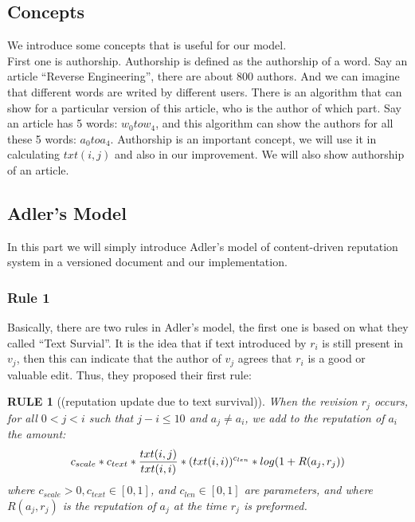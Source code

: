 \documentclass[preprint,review,12pt]{elsarticle}
\begin{document}
\subsection{Concepts}
We introduce some concepts that is useful for our model.\\
First one is authorship. Authorship is defined as the authorship of a word. Say
an article ``Reverse Engineering'', there are about 800 authors. And we can
imagine that different words are writed by different users. There is an
algorithm that can show for a particular version of this article, who is the
author of which part. Say an article has 5 words: $w_0 to w_4$, and this
algorithm can show the authors for all these 5 words: $a_0 to a_4$. Authorship
is an important concept, we will use it in calculating $txt(i,j)$ and also in
our improvement. We will also show authorship of an article.\\

\subsection{Adler's Model}
In this part we will simply introduce Adler's model of content-driven reputation
system in a versioned document and our implementation.\\
\subsubsection{Rule 1}
Basically, there are two rules in Adler's model, the first one is based on what
they called ``Text Survial''. It is the idea that if text introduced by $r_i$ is
still present in $v_j$, then this can indicate that the author of $v_j$ agrees
that $r_i$ is a good or valuable edit. Thus, they proposed their first rule:\\
\newtheorem{ruullee}{RULE}
\begin{ruullee}[(reputation update due to text survival)]
  When the revision $r_j$ occurs, for all $0<j<i$ such that $j-i \leq 10$ and
  $a_j \neq a_i$, we add to the reputation of $a_i$ the amount:\\
  \[
  \centering c_{scale}*c_{text}*\frac{txt(i,j)}{txt(i,i)}*(txt(i,i))^{c_{len}}*log(1+R(a_j,r_j))
  \]
  where $c_{scale} > 0, c_{text} \in [0,1]$, and $c_{len} \in [0,1]$ are
  parameters, and where $R(a_j, r_j)$ is the reputation of $a_j$ at the time
  $r_j$ is preformed. 
\end{ruullee}
\end{document}

